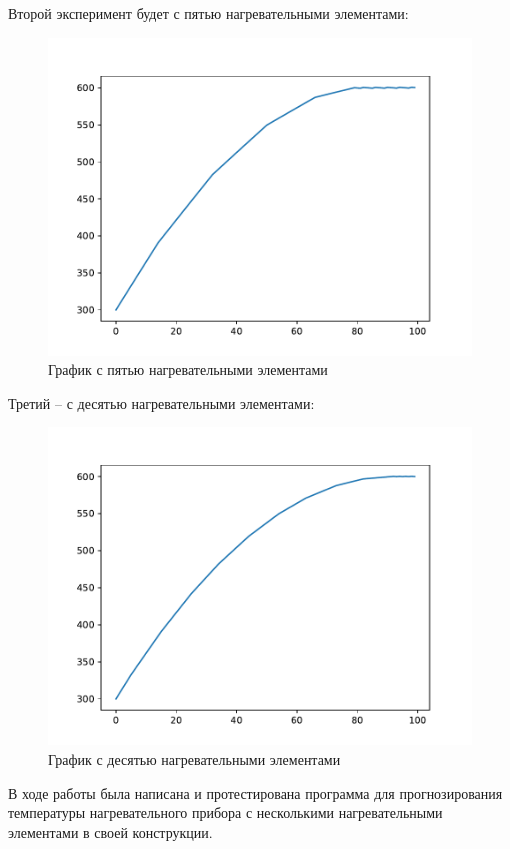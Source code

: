 \documentclass[a4paper, 14pt, titlepage, fleqn]{extarticle}
\begin{document}
            Второй эксперимент будет с пятью нагревательными элементами:
            \begin{figure}[H]
                \centering
                \includegraphics[width = .7\textwidth]{assets/n5t100T600.pdf}
                \caption[.] {График с пятью нагревательными элементами}
            \end{figure}

            Третий -- с десятью нагревательными элементами:
            \begin{figure}[H]
                \centering
                \includegraphics[width = .7\textwidth]{assets/n10t100T100.pdf}
                \caption[.] {График с десятью нагревательными элементами}
            \end{figure}            

        
        В ходе работы была написана и протестирована программа для прогнозирования температуры нагревательного прибора с несколькими нагревательными элементами в своей конструкции. 
\end{document}
